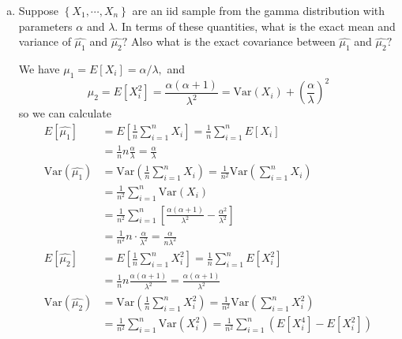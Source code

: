 \documentclass{article}
\newcommand{\var}{\mathrm{Var}}
\begin{document}
\begin{enumerate}
		\begin{enumerate}[(a)]
			\item Suppose $\left\{ X_1, \cdots, X_n \right\}$ are an iid sample from the gamma distribution with parameters $\alpha$ and $\lambda.$ In terms of these quantities, what is the exact mean and variance of $\hat{\mu_1}$ and $\hat{\mu_2}?$ Also what is the exact covariance between $\hat{\mu_1}$ and $\hat{\mu_2}?$
				\begin{soln}
					We have $\mu_1=E[X_i]=\alpha/\lambda,$ and \[\mu_2 = E[X_i^2]=\frac{\alpha(\alpha+1)}{\lambda^2}=\var(X_i) + \left( \frac{\alpha}{\lambda} \right)^2\] so we can calculate
					\begin{align*}
						E[\hat{\mu_1}] &= E\left[ \frac{1}{n}\sum_{i=1}^{n} X_i \right] = \frac{1}{n} \sum_{i=1}^{n} E[X_i] \\
						&= \frac{1}{n} n\frac{\alpha}{\lambda} = \boxed{\frac{\alpha}{\lambda}} \\
						\var(\hat{\mu_1}) &= \var\left( \frac{1}{n}\sum_{i=1}^{n} X_i \right) = \frac{1}{n^2} \var\left( \sum_{i=1}^{n} X_i \right) \\
						&= \frac{1}{n^2}\sum_{i=1}^{n} \var(X_i) \\
						&= \frac{1}{n^2}\sum_{i=1}^{n} \left[ \frac{\alpha(\alpha+1)}{\lambda^2}-\frac{\alpha^2}{\lambda^2}  \right] \\
						&= \frac{1}{n^2}n\cdot\frac{\alpha}{\lambda^2} = \boxed{\frac{\alpha}{n\lambda^2}} \\
						E[\hat{\mu_2}] &= E\left[ \frac{1}{n}\sum_{i=1}^{n} X_i^2 \right] = \frac{1}{n} \sum_{i=1}^{n} E[X_i^2] \\
						&= \frac{1}{n}n\frac{\alpha(\alpha+1)}{\lambda^2} = \boxed{\frac{\alpha(\alpha+1)}{\lambda^2}} \\
						\var(\hat{\mu_2}) &= \var\left( \frac{1}{n}\sum_{i=1}^{n} X_i^2 \right) = \frac{1}{n^2}\var\left( \sum_{i=1}^{n} X_i^2 \right) \\
						&= \frac{1}{n^2} \sum_{i=1}^{n}\var(X_i^2) = \frac{1}{n^2}\sum_{i=1}^{n}\left( E[X_i^4]-E[X_i^2] \right)
					\end{align*}


\end{soln}
\end{enumerate}
\end{enumerate}
\end{document}
